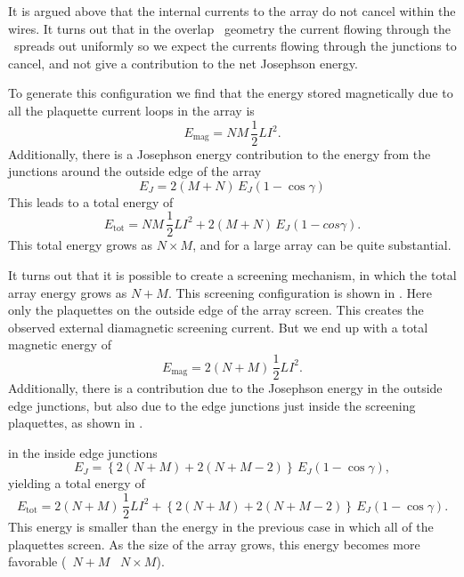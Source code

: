 It is argued above that 
the internal currents to the array do not cancel within the wires. 
It turns out that in the overlap \jjnoun\ geometry the current
flowing through the \jjnoun\ spreads out uniformly so we expect
the currents flowing through the junctions to cancel, and not
give a contribution to the net Josephson energy. 

To generate this configuration we find that the energy stored
magnetically due to all the plaquette current loops in the array 
is
%
\begin{equation}
E_{\mathrm{mag}} = NM\, \frac{1}{2} LI^2.
\end{equation}
%
Additionally, there is a Josephson energy contribution to the energy
from the junctions around the outside edge of the array
%
\begin{equation}
E_J = 2(M+N)\, E_J (1-\cos\gamma)
\end{equation}
%
This leads to a total energy of 
%
\begin{equation}
E_{\mathrm{tot}} =  NM \,\frac{1}{2} LI^2 + 
          2(M+N)\, E_J (1-cos\gamma).
\label{eqn:all_loop_screening}
\end{equation}
%
This total energy grows as $N\times M$, and for a large array can be quite 
substantial. 

It turns out that it is possible to create a screening mechanism, in
which the total array energy grows as $N+M$. 
This screening configuration is shown in 
. Here only the plaquettes on 
the outside edge of the array screen. This creates the observed external
diamagnetic screening current. But we end up with a total magnetic
energy of 
%
\begin{equation}
E_{\mathrm{mag}} = 2(N+M)\, \frac{1}{2} LI^2.
\end{equation}
% 
Additionally, there is a contribution due to the Josephson energy
in the outside edge junctions, but also due to the edge 
junctions just inside the screening plaquettes, as shown in 
. 

in the inside edge junctions
%
\begin{equation}
E_J =\left\{ 2(N+M) + 2(N + M - 2) \right\}\, E_J (1-\cos\gamma),
\end{equation}
%
yielding a total energy of 
%
\begin{equation}
E_{\mathrm{tot}} = 2(N+M)\, \frac{1}{2} LI^2 +
 \left\{ 2(N+M) + 2(N + M - 2) \right\}\, E_J (1-\cos\gamma).
\label{eqn:edge_loop_screening}
\end{equation}
%
This energy is smaller than the energy in the previous case
in which all of the plaquettes screen. As the size of the array
grows, this energy becomes more favorable (\cf\ $N+M$ \vs\ $N\times M$).


